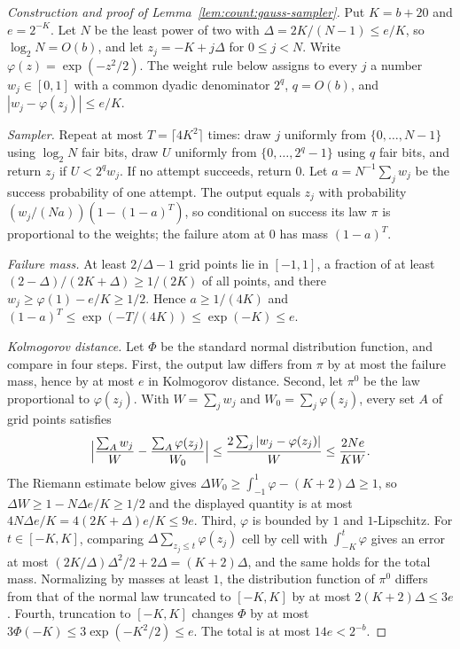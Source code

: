 \begin{proof}[Construction and proof of Lemma~\ref{lem:count:gauss-sampler}]
Put $K=b+20$ and $e=2^{-K}$. Let $N$ be the least power of two with
$\Delta=2K/(N-1)\le e/K$, so $\log_2N=O(b)$, and let $z_j=-K+j\Delta$ for
$0\le j<N$. Write $\varphi(z)=\exp(-z^2/2)$. The weight rule below assigns
to every $j$ a number $w_j\in[0,1]$ with a common dyadic denominator $2^q$,
$q=O(b)$, and $|w_j-\varphi(z_j)|\le e/K$.

\emph{Sampler.} Repeat at most $T=\lceil4K^2\rceil$ times: draw $j$ uniformly
from $\{0,\dots,N-1\}$ using $\log_2N$ fair bits, draw $U$ uniformly from
$\{0,\dots,2^q-1\}$ using $q$ fair bits, and return $z_j$ if $U<2^qw_j$. If no
attempt succeeds, return $0$. Let $a=N^{-1}\sum_jw_j$ be the success
probability of one attempt. The output equals $z_j$ with probability
$(w_j/(Na))(1-(1-a)^T)$, so conditional on success its law $\pi$ is
proportional to the weights; the failure atom at $0$ has mass $(1-a)^T$.

\emph{Failure mass.} At least $2/\Delta-1$ grid points lie in $[-1,1]$, a
fraction of at least $(2-\Delta)/(2K+\Delta)\ge1/(2K)$ of all points, and
there $w_j\ge\varphi(1)-e/K\ge1/2$. Hence $a\ge1/(4K)$ and
$(1-a)^T\le\exp(-T/(4K))\le\exp(-K)\le e$.

\emph{Kolmogorov distance.} Let $\Phi$ be the standard normal distribution
function, and compare in four steps. First, the output law differs from
$\pi$ by at most the failure mass, hence by at most $e$ in Kolmogorov
distance. Second, let $\pi^0$ be the law proportional to
$\varphi(z_j)$. With $W=\sum_jw_j$ and $W_0=\sum_j\varphi(z_j)$, every set $A$
of grid points satisfies
\[
 \Bigl|\frac{\sum_Aw_j}{W}-\frac{\sum_A\varphi(z_j)}{W_0}\Bigr|
 \le\frac{2\sum_j|w_j-\varphi(z_j)|}{W}\le\frac{2Ne}{KW}.
\]
The Riemann estimate below gives $\Delta W_0\ge\int_{-1}^1\varphi-(K+2)\Delta\ge1$,
so $\Delta W\ge1-N\Delta e/K\ge1/2$ and the displayed quantity is at most
$4N\Delta e/K=4(2K+\Delta)e/K\le9e$. Third, $\varphi$ is bounded by $1$ and
$1$-Lipschitz. For $t\in[-K,K]$, comparing $\Delta\sum_{z_j\le t}\varphi(z_j)$
cell by cell with $\int_{-K}^t\varphi$ gives an error at most
$(2K/\Delta)\Delta^2/2+2\Delta=(K+2)\Delta$, and the same holds for the total
mass. Normalizing by masses at least $1$, the distribution function of $\pi^0$
differs from that of the normal law truncated to $[-K,K]$ by at most
$2(K+2)\Delta\le3e$. Fourth, truncation to $[-K,K]$ changes $\Phi$ by at most
$3\Phi(-K)\le3\exp(-K^2/2)\le e$. The total is at most $14e<2^{-b}$.


\end{proof}
